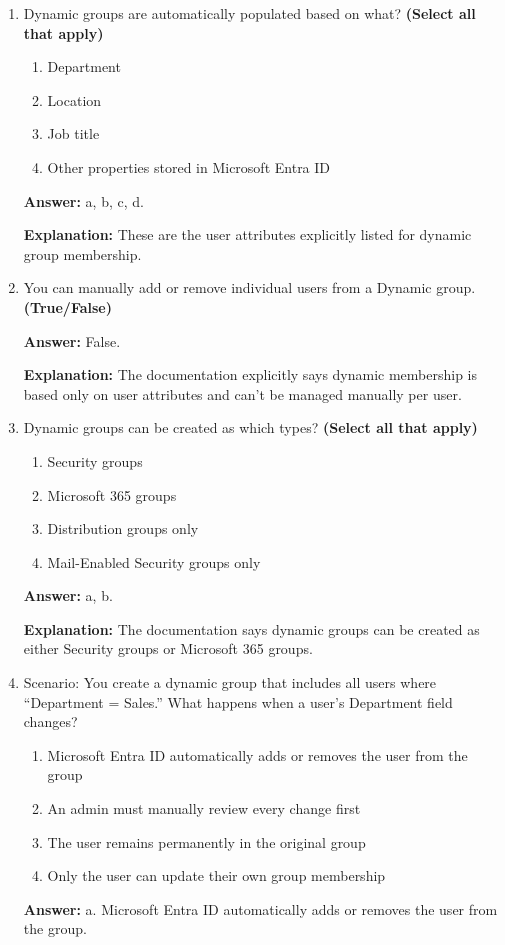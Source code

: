 \documentclass[10pt]{article}
\begin{document}
\begin{enumerate}[leftmargin=*]
\textbf{Explanation:} The documentation says HR might use a ``Company Announcements'' distribution group to send all-staff updates.

\item Dynamic groups are automatically populated based on what? \textbf{(Select all that apply)}
\begin{enumerate}[label=\alph*., leftmargin=1.5em]
\item Department
\item Location
\item Job title
\item Other properties stored in Microsoft Entra ID
\end{enumerate}
\textbf{Answer:} a, b, c, d.

\textbf{Explanation:} These are the user attributes explicitly listed for dynamic group membership.

\item You can manually add or remove individual users from a Dynamic group. \textbf{(True/False)}

\textbf{Answer:} False.

\textbf{Explanation:} The documentation explicitly says dynamic membership is based only on user attributes and can’t be managed manually per user.

\item Dynamic groups can be created as which types? \textbf{(Select all that apply)}
\begin{enumerate}[label=\alph*., leftmargin=1.5em]
\item Security groups
\item Microsoft 365 groups
\item Distribution groups only
\item Mail-Enabled Security groups only
\end{enumerate}
\textbf{Answer:} a, b.

\textbf{Explanation:} The documentation says dynamic groups can be created as either Security groups or Microsoft 365 groups.

\item Scenario: You create a dynamic group that includes all users where ``Department = Sales.'' What happens when a user’s Department field changes?
\begin{enumerate}[label=\alph*., leftmargin=1.5em]
\item Microsoft Entra ID automatically adds or removes the user from the group
\item An admin must manually review every change first
\item The user remains permanently in the original group
\item Only the user can update their own group membership
\end{enumerate}
\textbf{Answer:} a. Microsoft Entra ID automatically adds or removes the user from the group.


\end{enumerate}
\end{document}
